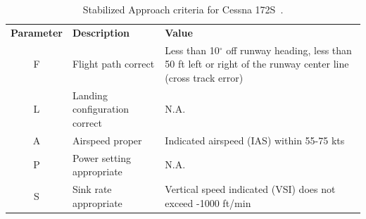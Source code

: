         \begin{table}
            \caption{\small{Stabilized Approach criteria for Cessna 172S~\cite{und_flight_manual}.}} \label{tab:approach_thresholds}
            \vspace{3pt}
            \centering
            \begin{tabular}{@{} c >{\raggedright\arraybackslash} m{.3\linewidth} m{.42\linewidth} @{}}
                \hline\noalign{\smallskip}
                \bfseries Parameter & \bfseries Description & \bfseries Value \\
                \noalign{\smallskip}
                \hline
                \noalign{\smallskip}
                F & Flight path correct & Less than 10$^\circ$ off runway heading, less than 50 ft left or right of the runway center line (cross track error) \\ \hline
                L & Landing configuration correct & N.A. \\ \hline
                A & Airspeed proper & Indicated airspeed (IAS) within 55-75 kts \\ \hline
                P & Power setting appropriate & N.A. \\ \hline
                S & Sink rate appropriate & Vertical speed indicated (VSI) does not exceed -1000 ft/min \\ \hline
            \end{tabular}
        \end{table}
        
